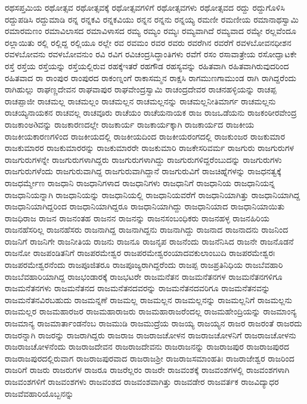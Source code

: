{ರಥಸಪ್ತಮಿಯ
ರಥೋತ್ಸವ
ರಥೋತ್ಸವಕ್ಕೆ
ರಥೋತ್ಸವಗಳಿಗೆ
ರಥೋತ್ಸವಗಳು
ರಥೋತ್ಸವದ
ರದ್ದು
ರದ್ದುಗೊಳಿಸಿ
ರದ್ದುಪಡಿಸಿ
ರದ್ದುಮಾಡಿ
ರನ್ನ
ರನ್ನಕವಿ
ರನ್ನಕವಿಯು
ರನ್ನನ
ರನ್ನನು
ರನ್ನಯ್ಯ
ರಮಣೀ
ರಮಣೀಯ
ರಮಾನಾಥಸ್ವಾಮಿ
ರಮಾರಮಣಂ
ರಮಾವಿಲಾಸದ
ರಮಾವಿಳಾಸದ
ರಮ್ಯ
ರಮ್ಯಂ
ರಮ್ಯಃ
ರಮ್ಯವಾಗಿದೆ
ರಮ್ಯವಾದ
ರಮ್ಯೇ
ರಲ್ಲವೆಂದೂ
ರಲ್ಲಾಯಿತು
ರಲ್ಲಿ
ರಲ್ಲಿದ್ದ
ರಲ್ಲಿಯೂ
ರಲ್ಲೇ
ರವ
ರವಮಂ
ರವರ
ರವರು
ರವರೆಗಿನ
ರವರೆಗೆ
ರವಳಬೋವನಧೀಶನ
ರವಳಬೋವನು
ರವಳಬೋವನುಂ
ರವಿ
ರವಿಗ
ರವಿಚಂದ್ರಸಿದ್ಧಾಂತಿಗಳು
ರವೆಗೆ
ರಸಂ
ರಸಾವಾತ್ರೇಯ
ರಸೋದ್ಘಾಟಕೇ
ರಸ್ತೆ
ರಸ್ತೆಯ
ರಸ್ತೆಯನ್ನು
ರಸ್ತೆಯಲ್ಲಿರುವ
ರಹಕ್ಕೆಇತರೆ
ರಹಗೌಡ
ರಹಸ್ಯವನ್ನು
ರಹಿತವಾಗಿ
ರಹಿತವಾಗಿರುವುದರಿಂದ
ರಹಿತವಾದ
ರಾ
ರಾಂಪುರ
ರಾಂಪುರದ
ರಾಕಂಣ್ನಂಗೆ
ರಾಕಾಸಮ್ಮನ
ರಾಕ್ಷಸಿ
ರಾಗಮುಣಗಾಮುಂಡ
ರಾಗಿ
ರಾಗಿದ್ದರೆಂದು
ರಾಗಿಹುಲ್ಲು
ರಾಘಣ್ಣದೇವನ
ರಾಘವಾಪುರ
ರಾಘವೇಂದ್ರಸ್ವಾಮಿ
ರಾಚಂದ್ರದೇವರ
ರಾಚನಹಳ್ಳಿಯನ್ನು
ರಾಚಪ್ಪ
ರಾಚಪ್ಪಾಜೀ
ರಾಚಮಲ್ಲ
ರಾಚಮಲ್ಲಂ
ರಾಚಮಲ್ಲನ
ರಾಚಮಲ್ಲನನ್ನು
ರಾಚಮಲ್ಲನೀತಿಮಾರ್ಗ
ರಾಚಮಲ್ಲನು
ರಾಚಯ್ಯನಾಯಕನ
ರಾಚವಲ್ಲ
ರಾಚವೂರು
ರಾಚೆಯಂ
ರಾಚೆಯನಾಯಕ
ರಾಜ
ರಾಜಒಡೆಯನು
ರಾಜಕಂಠೀರವೇಂದ್ರ
ರಾಜಕಾಂಅðವನ್ನು
ರಾಜಕಾರಣದಲ್ಲೇ
ರಾಜಕಾರ್ಯ
ರಾಜಕಾರ್ಯಕ್ಕಾಗಿ
ರಾಜಕಾರ್ಯದ
ರಾಜಕೀಯ
ರಾಜಕೀಯಕಾರಣಗಳಿಂದ
ರಾಜಕೀಯದಲ್ಲಿ
ರಾಜಕೀಯದಿಂದ
ರಾಜಕೀಯರಂಗದಲ್ಲಿ
ರಾಜಕುಂಜರ
ರಾಜಕುಮಾರ
ರಾಜಕುಮಾರರ
ರಾಜಕುಮಾರರನ್ನು
ರಾಜಕುಮಾರರೇ
ರಾಜಕುಮಾರಿ
ರಾಜಕೇಸರಿವರ್ಮ
ರಾಜಗುರು
ರಾಜಗುರುಗಳ
ರಾಜಗುರುಗಳನ್ನೇ
ರಾಜಗುರುಗಳಾಗಿದ್ದರು
ರಾಜಗುರುಗಳಾಗಿದ್ದು
ರಾಜಗುರುಗಳಿದ್ದರೆಂಬುದನ್ನು
ರಾಜಗುರುಗಳು
ರಾಜಗುರುಗಳೆಂದು
ರಾಜಗುರುವಾಗಿದ್ದ
ರಾಜಗುರುವಾಗಿದ್ದಾನೆ
ರಾಜಗುರುವಿಗೆ
ರಾಜಚಿಹ್ನೆಗಳನ್ನು
ರಾಜಧನತ್ವಕ್ಕೆ
ರಾಜಧರ್ಮ್ಮೇಣ
ರಾಜಧಾನಿ
ರಾಜಧಾನಿಗಳಾದ
ರಾಜಧಾನಿಗಳು
ರಾಜಧಾನಿಗೆ
ರಾಜಧಾನಿಯ
ರಾಜಧಾನಿಯನ್ನ
ರಾಜಧಾನಿಯನ್ನಾಗಿ
ರಾಜಧಾನಿಯನ್ನು
ರಾಜಧಾನಿಯಲ್ಲಿ
ರಾಜಧಾನಿಯವರೆಗೆ
ರಾಜಧಾನಿಯಾಗಿತ್ತು
ರಾಜಧಾನಿಯಾಗಿದ್ದ
ರಾಜಧಾನಿಯಾಗಿದ್ದರಿಂದ
ರಾಜಧಾನಿಯಾಗಿದ್ದರೂ
ರಾಜಧಾನಿಯಾಗಿದ್ದು
ರಾಜಧಾನಿಯಾದ
ರಾಜಧಾನಿಯಾಯಿತು
ರಾಜಧಿರಾಜ
ರಾಜನ
ರಾಜನಂತಹ
ರಾಜನನ
ರಾಜನನ್ನು
ರಾಜನಸಂಬಂಧಿಕರು
ರಾಜನಹಳ್ಳ
ರಾಜನಹಿರಿಯ
ರಾಜನಹೆಸರಿಲ್ಲ
ರಾಜನಹೆಸರು
ರಾಜನಾಗಿದ್ದ
ರಾಜನಾಗಿದ್ದನು
ರಾಜನಾಗಿದ್ದು
ರಾಜನಾದ
ರಾಜನಾದನು
ರಾಜನಿಂದ
ರಾಜನಿಗೆ
ರಾಜನಿಗೇ
ರಾಜನೀತಿಯ
ರಾಜನು
ರಾಜನೂ
ರಾಜನೃಪ
ರಾಜನೆಂದು
ರಾಜನೆನಿಸಿದ
ರಾಜನೇ
ರಾಜನೊಡನೆ
ರಾಜನೋ
ರಾಜಪಂಡಿತನಿಗೆ
ರಾಜಪರಮೇಶ್ವರ
ರಾಜಪರಮೇಶ್ವರಂಯಾದವಕುಲಾಂಬುದಿ
ರಾಜಪರಮೇಶ್ವರಃ
ರಾಜಪರಮೇಶ್ವರನೆಂದು
ರಾಜಪೂಜಿತರೂ
ರಾಜಪೂಜ್ಯರಾಗಿದ್ದರೆಂದು
ರಾಜಪ್ಪ
ರಾಜಪ್ರತಿನಿಧಿಯ
ರಾಜಬೆವಹಾರಿ
ರಾಜಬೆವಹಾರಿಯಾಗಿದ್ದ
ರಾಜಭಂಡಾರಕ್ಕೆ
ರಾಜಭಟರೇ
ರಾಜಮನೆತನ
ರಾಜಮನೆತನಗಳ
ರಾಜಮನೆತನಗಳಿಗೂ
ರಾಜಮನೆತನಗಳು
ರಾಜಮನೆತನದ
ರಾಜಮನೆತನದವರನ್ನು
ರಾಜಮನೆತನದವರಿಗೂ
ರಾಜಮನೆತನವನ್ನು
ರಾಜಮನೆತನವಿರಬಹುದು
ರಾಜಮನ್ನಣೆ
ರಾಜಮಲ್ಲ
ರಾಜಮಲ್ಲನ
ರಾಜಮಲ್ಲನನ್ನು
ರಾಜಮಲ್ಲನಿಗೆ
ರಾಜಮಲ್ಲನು
ರಾಜಮಲ್ಲರ
ರಾಜಮಹಾರಜರ
ರಾಜಮಹಾರಾಜರು
ರಾಜಮಹಾರಾಜರೆಂದಲ್ಲ
ರಾಜಮಹೇಂದ್ರಿಯನ್ನು
ರಾಜಮಾಂನ್ಯ
ರಾಜಮಾನ್ಯ
ರಾಜಮಾರ್ತಾಂಡನೆಂಬ
ರಾಜಮುಡಿ
ರಾಜಮುದ್ರೆಯ
ರಾಜಯ್ಯ
ರಾಜಯ್ಯನ
ರಾಜರ
ರಾಜರಂತೆ
ರಾಜರದು
ರಾಜರನ್ನಾಗಿ
ರಾಜರನ್ನು
ರಾಜರಾಗಿದ್ದರು
ರಾಜರಾಜ
ರಾಜರಾಜಚೋಳನ
ರಾಜರಾಜಚೋಳನಿಗೆ
ರಾಜರಾಜಚೋಳನು
ರಾಜರಾಜಚೋಳನೆಂದು
ರಾಜರಾಜದೇವನ
ರಾಜರಾಜದೇವನು
ರಾಜರಾಜನನ್ನು
ರಾಜರಾಜಪುರ
ರಾಜರಾಜಪುರದ
ರಾಜರಾಜಪುರದಲ್ಲಿರುವಾಗ
ರಾಜರಾಜಪುರವಾದ
ರಾಜರಾಜಶ್ರೀ
ರಾಜರಾಜಸಮಾಂಹತಿಃ
ರಾಜರಾಜೇಶ್ವರ
ರಾಜರಿಂದ
ರಾಜರಿಗೆ
ರಾಜರು
ರಾಜರುಗಳ
ರಾಜರೂ
ರಾಜರೆಲ್ಲರಂ
ರಾಜರೇ
ರಾಜವಂಶಕ್ಕೆ
ರಾಜವಂಶಗಳಲ್ಲಿ
ರಾಜವಂಶಗಳಾಗಿ
ರಾಜವಂಶಗಳಿಗೆ
ರಾಜವಂಶಗಳು
ರಾಜವಂಶದ
ರಾಜವಂಶವಾಗಿತ್ತು
ರಾಜವಡೇರ
ರಾಜವರ್ತಕ
ರಾಜವಿದ್ಯಾಧರ
ರಾಜವೆವಹಾರಿಯೊಬ್ಬನನ್ನು
}
